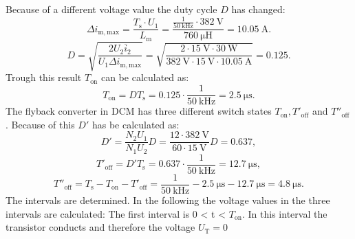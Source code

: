 
\begin{solutionblock}
    Because of a different voltage value the duty cycle $D$ has changed:
    \begin{equation}
        \Delta i_\mathrm{m,max}= \frac{T_\mathrm{s} \cdot U_1}{L_\mathrm{m}} = \frac{\frac{1}{\SI{50}{\kilo\hertz}}\cdot \SI{382}{\volt}}{\SI{760}{\micro\henry}}=\SI{10.05}{\ampere}.
    \end{equation}
    \begin{equation}
        D = \sqrt{\frac{2U_2\overline{i}_2}{U_1\Delta i_\mathrm{m,max}}} = \sqrt{\frac{2\cdot \SI{15}{\volt}\cdot\SI{30}{\watt}}{\SI{382}{\volt}\cdot\SI{15}{\volt}\cdot\SI{10.05}{\ampere}}} = 0.125.
    \end{equation}
    Trough this result $T_\mathrm{on}$ can be calculated as:
    \begin{equation}
        T_\mathrm{on} = D T_\mathrm{s} = 0.125 \cdot \frac{1}{\SI{50}{\kilo\hertz}} = \SI {2.5}{\micro\s}.
    \end{equation}
    The flyback converter in DCM has three different switch states $T_\mathrm{on}, T'_\mathrm{off}$ and $T''_\mathrm{off}$. Because of this $D'$ has be calculated as:
    \begin{equation}
        D' = \frac{N_\mathrm{2}U_\mathrm{1}}{N_\mathrm{1}U_\mathrm{2}}D = \frac{12\cdot \SI{382}{\volt}}{60 \cdot \SI{15}{\volt}} D = 0.637,
    \end{equation}
    \begin{equation}
        T'_\mathrm{off} = D' T_\mathrm{s} = 0.637 \cdot \frac{1}{\SI{50}{\kilo\hertz}} = \SI {12.7}{\micro\s},
    \end{equation}
    \begin{equation}
        T''_\mathrm{off}= T_\mathrm{s} -T_\mathrm{on}-T'_\mathrm{off} = \frac{1}{\SI{50}{\kilo\hertz}} - \SI {2.5}{\micro\s} - \SI {12.7}{\micro\s} = \SI {4.8}{\micro\s}.
    \end{equation}
    The intervals are determined. In the following the voltage values in the three intervals are calculated:
    The first interval is 0 < t < $T_\mathrm{on}$. In this interval the transistor conducts and therefore the voltage $U_\mathrm{T}=0$

\end{solutionblock}
